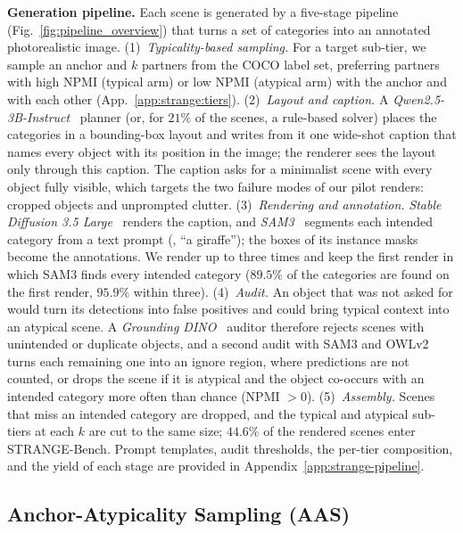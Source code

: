 \noindent\textbf{Generation pipeline.}
Each scene is generated by a five-stage pipeline (Fig.~\ref{fig:pipeline_overview}) that turns a set of categories into an annotated photorealistic image. (1)~\emph{Typicality-based sampling.} For a target sub-tier, we sample an anchor and $k$ partners from the COCO label set, preferring partners with high NPMI (typical arm) or low NPMI (atypical arm) with the anchor and with each other (App.~\ref{app:strange:tiers}). (2)~\emph{Layout and caption.} A \textit{Qwen2.5-3B-Instruct}~\cite{qwen2024qwen25} planner (or, for $21\%$ of the scenes, a rule-based solver) places the categories in a bounding-box layout and writes from it one wide-shot caption that names every object with its position in the image; the renderer sees the layout only through this caption. The caption asks for a minimalist scene with every object fully visible, which targets the two failure modes of our pilot renders: cropped objects and unprompted clutter. (3)~\emph{Rendering and annotation.} \textit{Stable Diffusion 3.5 Large}~\cite{stabilityai2024sd35,esser2024scaling} renders the caption, and \textit{SAM3}~\cite{carion2026sam3} segments each intended category from a text prompt (\eg, ``a giraffe''); the boxes of its instance masks become the annotations. We render up to three times and keep the first render in which SAM3 finds every intended category ($89.5\%$ of the categories are found on the first render, $95.9\%$ within three). (4)~\emph{Audit.} An object that was not asked for would turn its detections into false positives and could bring typical context into an atypical scene. A \textit{Grounding DINO}~\cite{liu2024grounding} auditor therefore rejects scenes with unintended or duplicate objects, and a second audit with SAM3 and OWLv2~\cite{minderer2023scaling} turns each remaining one into an ignore region, where predictions are not counted, or drops the scene if it is atypical and the object co-occurs with an intended category more often than chance (NPMI $> 0$). (5)~\emph{Assembly.} Scenes that miss an intended category are dropped, and the typical and atypical sub-tiers at each $k$ are cut to the same size; $44.6\%$ of the rendered scenes enter STRANGE-Bench. Prompt templates, audit thresholds, the per-tier composition, and the yield of each stage are provided in Appendix~\ref{app:strange-pipeline}.

\subsection{Anchor-Atypicality Sampling (AAS)}
\label{sec:aas}

